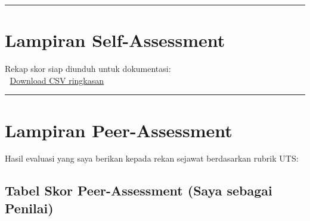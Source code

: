 \documentclass[
  letterpaper,
  DIV=11,
  numbers=noendperiod]{scrreprt}
\begin{document}
\begin{center}\rule{0.5\linewidth}{0.5pt}\end{center}

\section{Lampiran Self-Assessment}\label{lampiran-self-assessment}

Rekap skor siap diunduh untuk dokumentasi:\\
📂 \href{UTS_self_assessment.csv}{Download CSV ringkasan}

\begin{center}\rule{0.5\linewidth}{0.5pt}\end{center}

\section{Lampiran Peer-Assessment}\label{lampiran-peer-assessment}

Hasil evaluasi yang saya berikan kepada rekan sejawat berdasarkan rubrik
UTS:

\subsection{Tabel Skor Peer-Assessment (Saya sebagai
Penilai)}\label{tabel-skor-peer-assessment-saya-sebagai-penilai}
\end{document}
